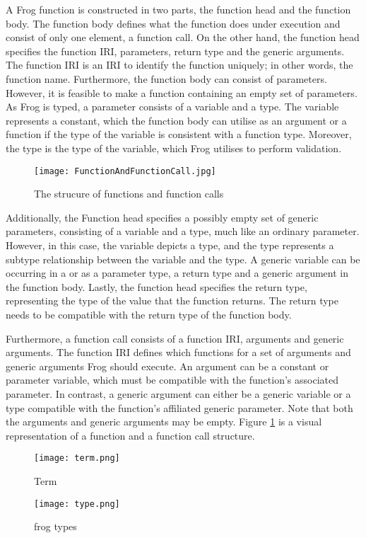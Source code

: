 \para
A Frog function is constructed in two parts, the function head and the function body. The function body defines what the function does under execution and consist of only one element, a function call. On the other hand, the function head specifies the function IRI, parameters, return type and the generic arguments. The function IRI is an IRI to identify the function uniquely; in other words, the function name. Furthermore, the function body can consist of parameters. However, it is feasible to make a function containing an empty set of parameters. As Frog is typed, a parameter consists of a variable and a type. The variable represents a constant, which the function body can utilise as an argument or a function if the type of the variable is consistent with a function type. Moreover, the type is the type of the variable, which Frog utilises to perform validation.

\begin{figure}[h]
    \centering
    \texttt{[image: FunctionAndFunctionCall.jpg]}
    \caption{The strucure of functions and function calls}
    \label{fig:functionCall_and_function}
\end{figure}

\para
Additionally, the Function head specifies a possibly empty set of generic parameters, consisting of a variable and a type, much like an ordinary parameter. However, in this case, the variable depicts a type, and the type represents a subtype relationship between the variable and the type. A generic variable can be occurring in a or as a parameter type, a return type and a generic argument in the function body. Lastly, the function head specifies the return type, representing the type of the value that the function returns. The return type needs to be compatible with the return type of the function body. 

\para
Furthermore, a function call consists of a function IRI, arguments and generic arguments. The function IRI defines which functions for a set of arguments and generic arguments Frog should execute. An argument can be a constant or parameter variable, which must be compatible with the function's associated parameter. In contrast, a generic argument can either be a generic variable or a type compatible with the function's affiliated generic parameter. Note that both the arguments and generic arguments may be empty. Figure \ref{fig:functionCall_and_function} is a visual representation of a function and a function call structure. 

\begin{figure}
    \centering
    \begin{minipage}{.5\textwidth}
      \centering
      \texttt{[image: term.png]}
      \caption{Term}
      \label{fig:term}
    \end{minipage}%
    \begin{minipage}{.5\textwidth}
      \centering
      \texttt{[image: type.png]}
      \caption{frog types}
      \label{fig:type}
    \end{minipage}
\end{figure}

